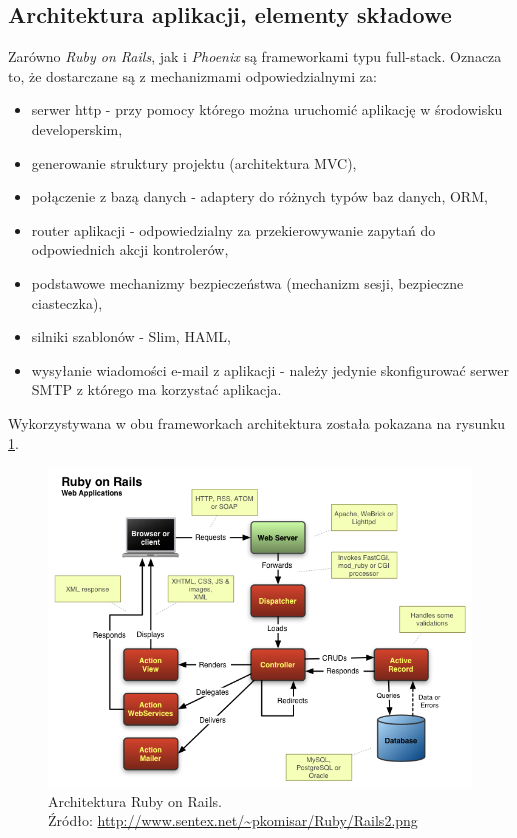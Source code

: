 \subsection{Architektura aplikacji, elementy składowe}
Zarówno \textit{Ruby on Rails}, jak i \textit{Phoenix} są frameworkami typu full-stack. Oznacza to, że dostarczane są z mechanizmami odpowiedzialnymi za:
\begin{itemize}
  \item serwer http - przy pomocy którego można uruchomić aplikację w środowisku developerskim,
  \item generowanie struktury projektu (architektura MVC),
  \item połączenie z bazą danych - adaptery do różnych typów baz danych, ORM,
  \item router aplikacji - odpowiedzialny za przekierowywanie zapytań do odpowiednich akcji kontrolerów,
  \item podstawowe mechanizmy bezpieczeństwa (mechanizm sesji, bezpieczne ciasteczka),
  \item silniki szablonów - Slim, HAML,
  \item wysyłanie wiadomości e-mail z aplikacji - należy jedynie skonfigurować serwer SMTP z którego ma korzystać aplikacja.
\end{itemize}

Wykorzystywana w obu frameworkach architektura została pokazana na rysunku \ref{fig:rails_architecture}.
\newpage
\begin{figure}[h]
  \centering
  \includegraphics[width=\linewidth]{images/rails_architecture}
  \caption{Architektura Ruby on Rails.\\Źródło: \url{http://www.sentex.net/~pkomisar/Ruby/Rails2.png}}
  \label{fig:rails_architecture}
\end{figure}

